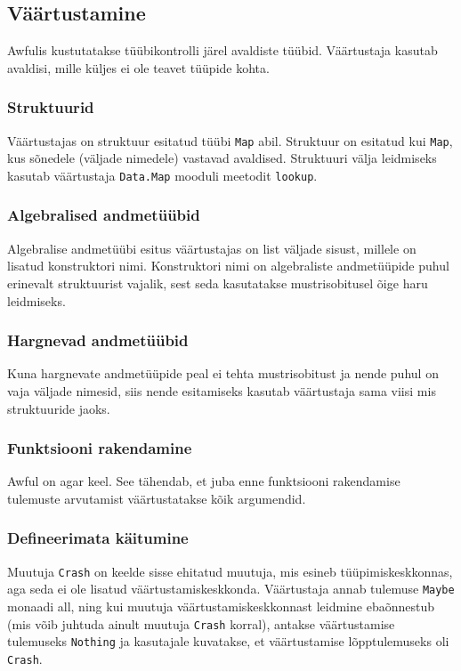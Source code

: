 \documentclass[12pt]{article}
\begin{document}
    \subsection{Väärtustamine}
      Awfulis kustutatakse tüübikontrolli järel avaldiste tüübid. Väärtustaja kasutab avaldisi, mille küljes ei ole teavet tüüpide kohta.
      \subsubsection{Struktuurid}
        Väärtustajas on struktuur esitatud tüübi \verb!Map! abil. Struktuur on esitatud kui \verb!Map!, kus sõnedele (väljade nimedele) vastavad avaldised. Struktuuri välja leidmiseks kasutab väärtustaja \verb!Data.Map! mooduli meetodit \verb!lookup!.
      \subsubsection{Algebralised andmetüübid}
        Algebralise andmetüübi esitus väärtustajas on list väljade sisust, millele on lisatud konstruktori nimi. Konstruktori nimi on algebraliste andmetüüpide puhul erinevalt struktuurist vajalik, sest seda kasutatakse mustrisobitusel õige haru leidmiseks.
      \subsubsection{Hargnevad andmetüübid}
        Kuna hargnevate andmetüüpide peal ei tehta mustrisobitust ja nende puhul on vaja väljade nimesid, siis nende esitamiseks kasutab väärtustaja sama viisi mis struktuuride jaoks.
      \subsubsection{Funktsiooni rakendamine}
        Awful on agar keel. See tähendab, et juba enne funktsiooni rakendamise tulemuste arvutamist väärtustatakse kõik argumendid.
      \subsubsection{Defineerimata käitumine}
        Muutuja \verb!Crash! on keelde sisse ehitatud muutuja, mis esineb tüüpimiskeskkonnas, aga seda ei ole lisatud väärtustamiskeskkonda. Väärtustaja annab tulemuse \verb!Maybe! monaadi all, ning kui muutuja väärtustamiskeskkonnast leidmine ebaõnnestub (mis võib juhtuda ainult muutuja \verb!Crash! korral), antakse väärtustamise tulemuseks \verb!Nothing! ja kasutajale kuvatakse, et väärtustamise lõpptulemuseks oli \verb!Crash!.
\end{document}
